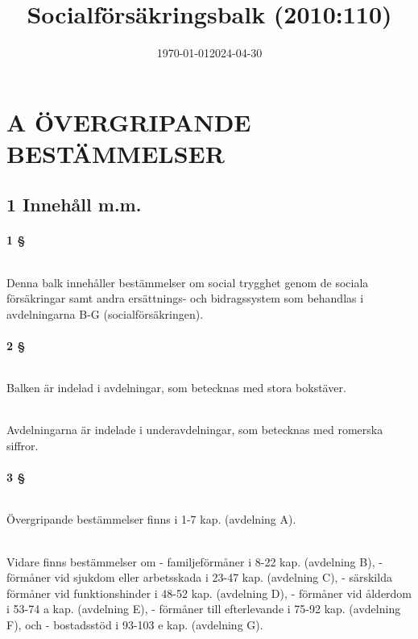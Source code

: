 \documentclass[a4paper,notitlepage,openany,10pt]{book}
\date{\today}
\title{Socialförsäkringsbalk (2010:110)}
\date{2024-04-30}
\begin{document}
\maketitle

\vfill

\newpage
\newpage
\part*{A ÖVERGRIPANDE BESTÄMMELSER}
\chapter*{1 Innehåll m.m.}
\subsection*{1 §}
\paragraph*{}
Denna balk innehåller bestämmelser om social trygghet genom de sociala försäkringar samt andra ersättnings- och bidragssystem som behandlas i avdelningarna B-G (socialförsäkringen).
\subsection*{2 §}
\paragraph*{}
Balken är indelad i avdelningar, som betecknas med stora bokstäver.
\paragraph*{}
Avdelningarna är indelade i underavdelningar, som betecknas med romerska siffror.
\subsection*{3 §}
\paragraph*{}
Övergripande bestämmelser finns i 1-7 kap. (avdelning A).
\paragraph*{}
Vidare finns bestämmelser om
\newline - familjeförmåner i 8-22 kap. (avdelning B),
\newline - förmåner vid sjukdom eller arbetsskada i 23-47 kap. (avdelning C),
\newline - särskilda förmåner vid funktionshinder i 48-52 kap. (avdelning D),
\newline - förmåner vid ålderdom i 53-74 a kap. (avdelning E),
\newline - förmåner till efterlevande i 75-92 kap. (avdelning F), och
\newline - bostadsstöd i 93-103 e kap. (avdelning G).
\end{document}
